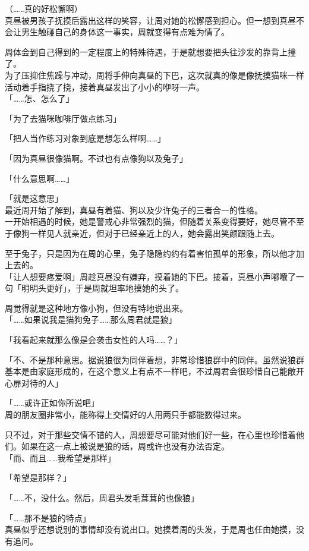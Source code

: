 （……真的好松懈啊）\\

真昼被男孩子抚摸后露出这样的笑容，让周对她的松懈感到担心。但一想到真昼不会让男生触碰自己的身体这一事实，周就变得有点难为情了。

周体会到自己得到的一定程度上的特殊待遇，于是就想要把头往沙发的靠背上撞了。\\

为了压抑住焦躁与冲动，周将手伸向真昼的下巴，这次就真的像是像抚摸猫咪一样活动着手指挠了挠，接着真昼发出了小小的咿呀一声。\\

「……怎、怎么了」

「为了去猫咪咖啡厅做点练习」

「把人当作练习对象到底是想怎么样啊……」

「因为真昼很像猫啊。不过也有点像狗以及兔子」

「什么意思啊……」

「就是这意思」\\

最近周开始了解到，真昼有着猫、狗以及少许兔子的三者合一的性格。\\

一开始相遇的时候，她是警戒心非常强烈的猫，但随着关系变得要好，她尽管不至于像狗一样见人就亲近，但对于已经亲近上的人，她会露出笑颜跟随上去。

至于兔子，只是因为在周的心里，兔子隐隐约约有着害怕孤单的形象，所以他才加上去的。\\

「让人想要疼爱啊」周趁真昼没有嫌弃，摸着她的下巴。接着，真昼小声嘟囔了一句「明明头更好」，于是周就坦率地摸她的头了。

周觉得就是这种地方像小狗，但没有特地说出来。\\

「……如果说我是猫狗兔子……那么周君就是狼」

「我看起来就那么像是会袭击女性的人吗……？」

「不、不是那种意思。据说狼很为同伴着想，非常珍惜狼群中的同伴。虽然说狼群基本是由家庭形成的，在这个意义上有点不一样吧，不过周君会很珍惜自己能敞开心扉对待的人」

「……或许正如你所说吧」\\

周的朋友圈非常小，能称得上交情好的人用两只手都能数得过来。

只不过，对于那些交情不错的人，周想要尽可能对他们好一些，在心里也珍惜着他们。如果在这一点上被说是狼的话，周或许也没有办法否定。\\

「而、而且……我希望是那样」

「希望是那样？」

「……不，没什么。然后，周君头发毛茸茸的也像狼」

「……那不是狼的特点」\\

真昼似乎还想说别的事情却没有说出口。她摸着周的头发，于是周也任由她摸，没有追问。
